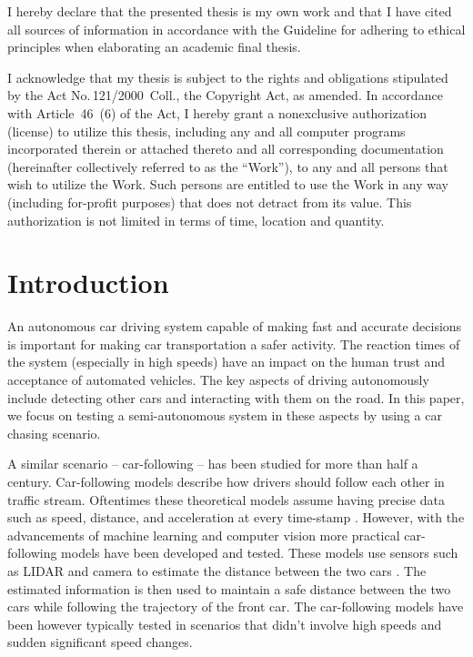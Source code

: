 \begin{declaration}
		I hereby declare that the presented thesis is my own work and that I have cited all sources of information in accordance with the Guideline for adhering to ethical principles when elaborating an academic final thesis.
		
		I acknowledge that my thesis is subject to the rights and obligations stipulated by the Act No.\,121/2000~Coll., the Copyright Act, as amended. In accordance with Article~46~(6) of the Act, I hereby grant a nonexclusive authorization (license) to utilize this thesis, including any and all computer programs incorporated therein or attached thereto and all corresponding documentation (hereinafter collectively referred to as the ``Work''), to any and all persons that wish to utilize the Work. Such persons are entitled to use the Work in any way (including for-profit purposes) that does not detract from its value. This authorization is not limited in terms of time, location and quantity.
\end{declaration}





\maketitle

\chapter{Introduction}
An autonomous car driving system capable of making fast and accurate decisions is important for making car transportation a safer activity. The reaction times of the system (especially in high speeds) have an impact on the human trust and acceptance of automated vehicles. The key aspects of driving autonomously include detecting other cars and interacting with them on the road. In this paper, we focus on testing a semi-autonomous system in these aspects by using a car chasing scenario. \par


A similar scenario -- car-following -- has been studied for more than half a century. Car-following models describe how drivers should follow each other in traffic stream. Oftentimes these theoretical models assume having precise data such as speed, distance, and acceleration at every time-stamp \cite{car_following}. However, with the advancements of machine learning and computer vision more practical car-following models have been developed and tested. These models use sensors such as LIDAR and camera to estimate the distance between the two cars \cite{lidar_highway}. The estimated information is then used to maintain a safe distance between the two cars while following the trajectory of the front car. The car-following models have been however typically tested in scenarios that didn't involve high speeds and sudden significant speed changes. \par
 
